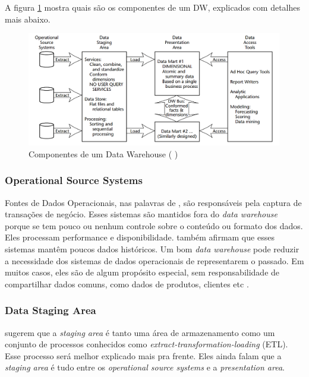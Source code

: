A figura \ref{dwComponents} mostra quais são os componentes de um DW, explicados com detalhes mais abaixo.
\begin{figure}[H]
\centering
\includegraphics[height=5cm]{imagens/componentes_DW.png}
\caption{Componentes de um Data Warehouse (\citeauthor{kimball2002} \citeyear{kimball2002})}
\label{dwComponents}
\end{figure}

\subsubsection{Operational Source Systems}
Fontes de Dados Operacionais, nas palavras de , são responsáveis pela captura de transações de negócio. Esses sistemas são mantidos fora do \textit{data warehouse} porque se tem pouco ou nenhum controle sobre o conteúdo ou formato dos dados. Eles processam performance e disponibilidade.  também afirmam que esses sistemas mantêm poucos dados históricos. Um bom \textit{data warehouse} pode reduzir a necessidade dos sistemas de dados operacionais de representarem o passado. Em muitos casos, eles são de algum propósito especial, sem responsabilidade de compartilhar dados comuns, como dados de produtos, clientes etc \citep{kimball2013}.

\subsubsection{Data Staging Area}
 sugerem que a \textit{staging area} é tanto uma área de armazenamento como um conjunto de processos conhecidos como \textit{extract-transformation-loading} (ETL). Esse processo será melhor explicado mais pra frente. Eles ainda falam que a \textit{staging area} é tudo entre os \textit{operational source systems} e a \textit{presentation area}. 

